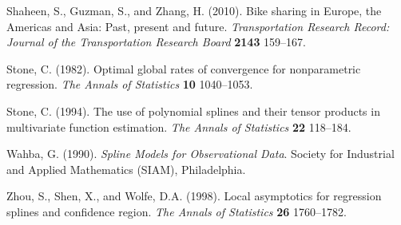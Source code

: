 \documentclass[titlepage,12pt]{article}
\begin{document}
\begin{description}
\item Shaheen, S., Guzman, S., and Zhang, H. (2010). Bike sharing in Europe,
the Americas and Asia: Past, present and future. \emph{Transportation
Research Record: Journal of the Transportation Research Board }\textbf{2143}
159--167.

\item Stone, C. (1982). Optimal global rates of convergence for
nonparametric regression. \emph{The Annals of Statistics }\textbf{10}
1040--1053.

\item Stone, C. (1994). The use of polynomial splines and their tensor
products in multivariate function estimation. \emph{The Annals of Statistics 
}\textbf{22} 118--184.

\item Wahba, G. (1990). \emph{Spline Models for Observational Data}. Society
for Industrial and Applied Mathematics (SIAM), Philadelphia.

\item Zhou, S., Shen, X., and Wolfe, D.A. (1998). Local asymptotics for
regression splines and confidence region. \emph{The Annals of Statistics }%
\textbf{26} 1760--1782.
\end{description}
\end{document}
